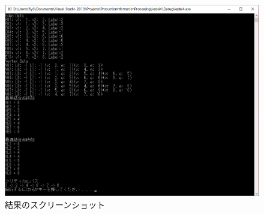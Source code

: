 \documentclass[a4paper,10pt]{jsarticle}
\begin{document}
\begin{figure}[!ht]
  \begin{center}
    \includegraphics[clip,width=14cm]{fig/png/result.png}
  \end{center}
  \caption{結果のスクリーンショット}
  \label{fig:結果のスクリーンショット}
\end{figure}
\end{document}
